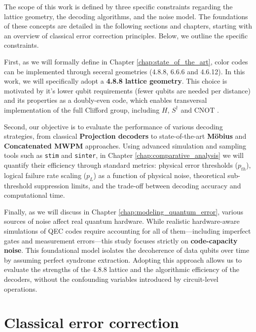 The scope of this work is defined by three specific constraints regarding the lattice geometry, the decoding algorithms, and the noise model. The foundations of these concepts are detailed in the following sections and chapters, starting with an overview of classical error correction principles. Below, we outline the specific constraints.

First, as we will formally define in Chapter \ref{chap:state_of_the_art}, color codes can be implemented through seceral geometries (4.8.8, 6.6.6 and 4.6.12). In this work, we will specifically adopt a \textbf{4.8.8 lattice geometry}. This choice is motivated by it's lower qubit requirements (fewer qubits are needed per distance) and its properties as a doubly-even code, which enables transversal implementation of the full Clifford group, including $H$, $S^\dagger$ and $\text{CNOT}$ \cite{bombin_martindelgado_2006}.

Second, our objective is to evaluate the performance of various decoding strategies, from classical \textbf{Projection decoders} to state-of-the-art \textbf{Möbius} and \textbf{Concatenated MWPM} approaches. Using advanced simulation and sampling tools such as \texttt{stim} \cite{gidney2021stim} and \texttt{sinter}, in Chapter \ref{chap:comparative_analysis} we will quantify their efficiency through standard metrics: physical error thresholds ($p_{th}$), logical failure rate scaling ($p_L$) as a function of physical noise, theoretical sub-threshold suppression limits, and the trade-off between decoding accuracy and computational time.

Finally, as we will discuss in Chapter \ref{chap:modeling_quantum_error}, various sources of noise affect real quantum hardware. While realistic hardware-aware simulations of QEC codes require accounting for all of them—including imperfect gates and measurement errors—this study focuses strictly on \textbf{code-capacity noise}. This foundational model isolates the decoherence of data qubits over time by assuming perfect syndrome extraction. Adopting this approach allows us to evaluate the strengths of the 4.8.8 lattice and the algorithmic efficiency of the decoders, without the confounding variables introduced by circuit-level operations.

\section{Classical error correction}
\label{sec:classical_error}

